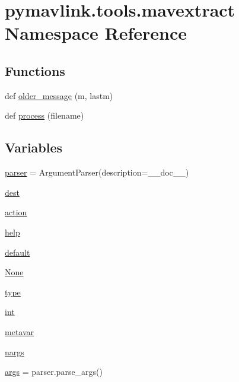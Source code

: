 \hypertarget{namespacepymavlink_1_1tools_1_1mavextract}{}\section{pymavlink.\+tools.\+mavextract Namespace Reference}
\label{namespacepymavlink_1_1tools_1_1mavextract}
\subsection*{Functions}
\begin{DoxyCompactItemize}
\item 
def \mbox{\hyperlink{namespacepymavlink_1_1tools_1_1mavextract_a0695c30418a7a66ccfdd36d36e194708}{older\+\_\+message}} (m, lastm)
\item 
def \mbox{\hyperlink{namespacepymavlink_1_1tools_1_1mavextract_aa4c714213c51b033aae1046e5ce2e1ab}{process}} (filename)
\end{DoxyCompactItemize}
\subsection*{Variables}
\begin{DoxyCompactItemize}
\item 
\mbox{\hyperlink{namespacepymavlink_1_1tools_1_1mavextract_aee740166d1f1332d9c6333466f8a6ce2}{parser}} = Argument\+Parser(description=\+\_\+\+\_\+doc\+\_\+\+\_\+)
\item 
\mbox{\hyperlink{namespacepymavlink_1_1tools_1_1mavextract_a7debd290a3cf9d7a5d4ca70b6bf96fcb}{dest}}
\item 
\mbox{\hyperlink{namespacepymavlink_1_1tools_1_1mavextract_a012de8ef8cc089ea7b1b706cc12a05bb}{action}}
\item 
\mbox{\hyperlink{namespacepymavlink_1_1tools_1_1mavextract_a7e54a401d0f11779e41a75e213f53e73}{help}}
\item 
\mbox{\hyperlink{namespacepymavlink_1_1tools_1_1mavextract_adad293b4792f724f913423b1006abd31}{default}}
\item 
\mbox{\hyperlink{namespacepymavlink_1_1tools_1_1mavextract_a6a1ded8ef70ec3ca3bc88057baa38fa7}{None}}
\item 
\mbox{\hyperlink{namespacepymavlink_1_1tools_1_1mavextract_a66a2ee63fed8b11066152eb667c63220}{type}}
\item 
\mbox{\hyperlink{namespacepymavlink_1_1tools_1_1mavextract_a04f63779e7ab2e172c3752d6ab4e7328}{int}}
\item 
\mbox{\hyperlink{namespacepymavlink_1_1tools_1_1mavextract_ac94675b920c6754633d0e410d5f54410}{metavar}}
\item 
\mbox{\hyperlink{namespacepymavlink_1_1tools_1_1mavextract_ab5566ab9c047002961c9af079d040310}{nargs}}
\item 
\mbox{\hyperlink{namespacepymavlink_1_1tools_1_1mavextract_ac5b60c4a676c910e635ddd1c77293899}{args}} = parser.\+parse\+\_\+args()
\end{DoxyCompactItemize}


